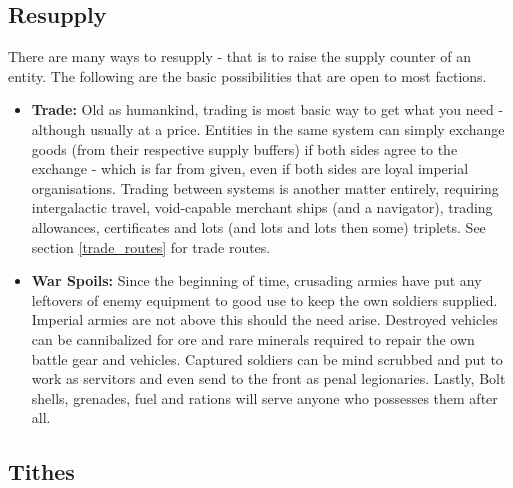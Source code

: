 \subsection{Resupply} \label{resupply}
There are many ways to resupply - that is to raise the supply counter of an entity. The following are the basic possibilities that are open to most factions.
\begin{itemize}
    \item \textbf{Trade:} Old as humankind, trading is most basic way to get what you need - although usually at a price. Entities in the same system can simply exchange goods (from their respective supply buffers) if both sides agree to the exchange - which is far from given, even if both sides are loyal imperial organisations. Trading between systems is another matter entirely, requiring intergalactic travel, void-capable merchant ships (and a navigator), trading allowances, certificates and lots (and lots and lots then some) triplets. See section \ref{trade_routes} for trade routes.
    
    
    \item \textbf{War Spoils:} Since the beginning of time, crusading armies have put any leftovers of enemy equipment to good use to keep the own soldiers supplied. Imperial armies are not above this should the need arise. Destroyed vehicles can be cannibalized for ore and rare minerals required to repair the own battle gear and vehicles. Captured soldiers can be mind scrubbed and put to work as servitors and even send to the front as penal legionaries. Lastly, Bolt shells, grenades, fuel and rations will serve anyone who possesses them after all.
    
\end{itemize}


\subsection{Tithes}
